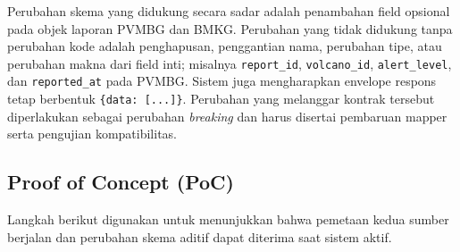 Perubahan skema yang didukung secara sadar adalah penambahan field opsional
pada objek laporan PVMBG dan BMKG. Perubahan yang tidak didukung tanpa
perubahan kode adalah penghapusan, penggantian nama, perubahan tipe, atau
perubahan makna dari field inti; misalnya \texttt{report\_id},
\texttt{volcano\_id}, \texttt{alert\_level}, dan \texttt{reported\_at} pada
PVMBG. Sistem juga mengharapkan envelope respons tetap berbentuk
\texttt{\{data: [...]\}}. Perubahan yang melanggar kontrak tersebut diperlakukan
sebagai perubahan \textit{breaking} dan harus disertai pembaruan mapper serta
pengujian kompatibilitas.

\subsection{Proof of Concept (PoC)}
Langkah berikut digunakan untuk menunjukkan bahwa pemetaan kedua sumber berjalan
dan perubahan skema aditif dapat diterima saat sistem aktif.

